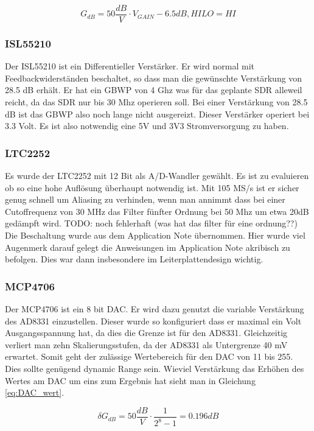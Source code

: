 \begin{equation}
    G_{dB} = 50 \frac{dB}{V} \cdot V_{GAIN} - 6.5 dB, HILO = HI
\label{eq:A8331_HI}
\end{equation}

\subsubsection{ISL55210}
Der ISL55210 ist ein Differentieller Verstärker. Er wird normal mit Feedbackwiderständen beschaltet, so dass man die gewünschte Verstärkung von 28.5 dB erhält.
Er hat ein GBWP von 4 Ghz was für das geplante SDR alleweil reicht, da das SDR nur bis 30 Mhz operieren soll. Bei einer Verstärkung von 28.5 dB ist das GBWP also noch lange nicht ausgereizt.
Dieser Verstärker operiert bei 3.3 Volt. Es ist also notwendig eine 5V und 3V3 Stromversorgung zu haben.

\subsubsection{LTC2252}
Es wurde der LTC2252 mit 12 Bit als A/D-Wandler gewählt. Es ist zu evaluieren ob so eine hohe Auflösung überhaupt notwendig ist.
Mit 105 MS/s ist er sicher genug schnell um Aliasing zu verhinden, wenn man annimmt dass bei einer Cutoffrequenz von 30 MHz das Filter fünfter Ordnung bei 50 Mhz um etwa 20dB gedämpft wird. TODO: noch fehlerhaft (was hat das filter für eine ordnung??)
Die Beschaltung wurde aus dem Application Note übernommen. Hier wurde viel Augenmerk darauf gelegt die Anweisungen im Application Note akribisch zu befolgen. Dies war dann insbesondere im Leiterplattendesign wichtig.

\subsubsection{MCP4706}
Der MCP4706 ist ein 8 bit DAC. Er wird dazu genutzt die variable Verstärkung des AD8331 einzustellen. Dieser wurde so konfiguriert dass er maximal ein Volt Ausgangsspannung hat, da dies die Grenze ist für den AD8331. Gleichzeitig verliert man zehn Skalierungsstufen, da der AD8331 als Untergrenze 40 mV erwartet. Somit geht der zulässige Wertebereich für den DAC von 11 bis 255. Dies sollte genügend dynamic Range sein. Wieviel Verstärkung das Erhöhen des Wertes am DAC um eins zum Ergebnis hat sieht man in Gleichung \ref{eq:DAC_wert}.

\begin{equation}
    \delta G_{dB} = 50 \frac{dB}{V} \cdot \frac{1}{2^8 - 1} = 0.196 dB
\label{eq:DAC_wert}
\end{equation}

